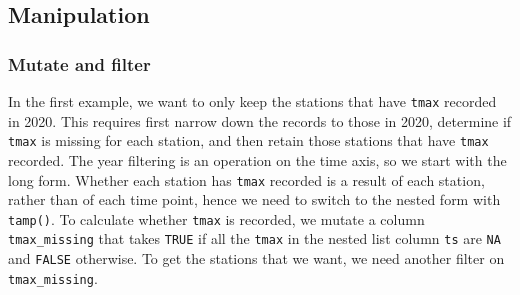 \documentclass{article}
\newenvironment{Shaded}{\begin{snugshade}}{\end{snugshade}}
\newcommand{\AttributeTok}[1]{\textcolor[rgb]{0.77,0.63,0.00}{#1}}
\newcommand{\ConstantTok}[1]{\textcolor[rgb]{0.00,0.00,0.00}{#1}}
\newcommand{\DecValTok}[1]{\textcolor[rgb]{0.00,0.00,0.81}{#1}}
\newcommand{\FunctionTok}[1]{\textcolor[rgb]{0.00,0.00,0.00}{#1}}
\newcommand{\NormalTok}[1]{#1}
\newcommand{\SpecialCharTok}[1]{\textcolor[rgb]{0.00,0.00,0.00}{#1}}
\begin{document}
\hypertarget{manipulation}{%
\subsection{Manipulation}\label{manipulation}}

\hypertarget{mutate-and-filter}{%
\subsubsection{Mutate and filter}\label{mutate-and-filter}}

In the first example, we want to only keep the stations that have
\texttt{tmax} recorded in 2020. This requires first narrow down the
records to those in 2020, determine if \texttt{tmax} is missing for each
station, and then retain those stations that have \texttt{tmax}
recorded. The year filtering is an operation on the time axis, so we
start with the long form. Whether each station has \texttt{tmax}
recorded is a result of each station, rather than of each time point,
hence we need to switch to the nested form with \texttt{tamp()}. To
calculate whether \texttt{tmax} is recorded, we mutate a column
\texttt{tmax\_missing} that takes \texttt{TRUE} if all the \texttt{tmax}
in the nested list column \texttt{ts} are \texttt{NA} and \texttt{FALSE}
otherwise. To get the stations that we want, we need another filter on
\texttt{tmax\_missing}.

\begin{Shaded}
\end{Shaded}
\end{document}
